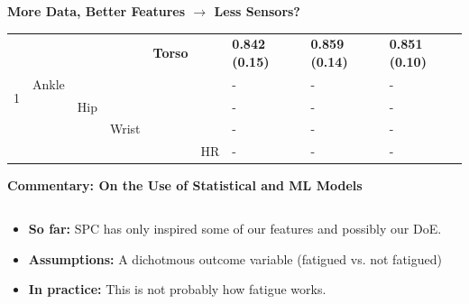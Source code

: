 \documentclass[aspectratio=43]{beamer}
\begin{document}
\begin{frame}{\textbf{More Data, Better Features $\longrightarrow$ Less Sensors?}}
{\begin{table}[h!]
\begin{tabular}{cllllllll}
		\multirow{5}{*}{1}                                           &  & &  & \textbf{\textbf{Torso}} &  & \textbf{\textbf{0.842 (0.15)}} & \textbf{\textbf{0.859 (0.14)}} & \textbf{\textbf{0.851 (0.10)}} \\
		& Ankle & &  & & &  - & - & -\\
		& & Hip & & &   & - & - & -\\
		&  &  & Wrist & &  & -  & - & -\\
		& &  &  &  & HR & - & - & -\\
		 \hline
	\end{tabular}
\end{table}

}
\end{frame}

\begin{frame}{\textbf{Commentary: On the Use of Statistical and ML Models}}
\begin{columns}
    \begin{column}{0.5\textwidth}
    \begin{dBox}
        \begin{itemize}
            \item \textbf{So far:} SPC has only inspired some of our features and possibly our DoE.
            \item \textbf{Assumptions:} A dichotmous outcome variable (fatigued vs. not fatigued)
            \item \textbf{In practice:} This is not probably how fatigue works. 
        \end{itemize}
    \end{dBox}
    \end{column}
    
    \begin{column}{0.48\textwidth}
        \centering 
        
    \end{column}
\end{columns}
\end{frame}
\end{document}
